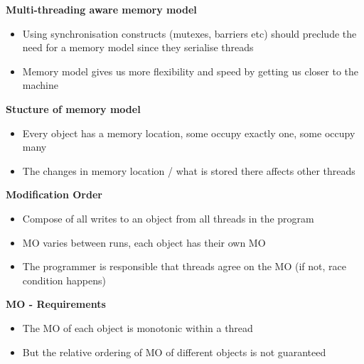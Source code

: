 \documentclass[10pt, landscape]{article}
\begin{document}
\begin{multicols}{4}
\textbf{Multi-threading aware memory model} \\ 
\begin{itemize}
    \item Using synchronisation constructs (mutexes, barriers etc) should preclude the need for a memory model since they serialise threads 
    \item Memory model gives us more flexibility and speed by getting us closer to the machine
\end{itemize}

\textbf{Stucture of memory model} \\
\begin{itemize}
    \item Every object has a memory location, some occupy exactly one, some occupy many 
    \item The changes in memory location / what is stored there affects other threads
\end{itemize}

\textbf{Modification Order} \\ 
\begin{itemize}
    \item Compose of all writes to an object from all threads in the program
    \item MO varies between runs, each object has their own MO
    \item The programmer is responsible that threads agree on the MO (if not, race condition happens)  
\end{itemize}

\textbf{MO - Requirements} \\ 
\begin{itemize}
    \item The MO of each object is monotonic within a thread 
    \item But the relative ordering of MO of different objects is not guaranteed
\end{itemize}


\end{multicols}
\end{document}
